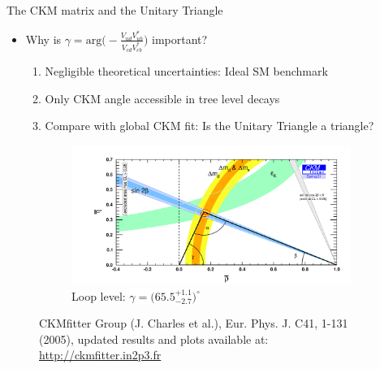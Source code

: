\documentclass[dvipsnames]{beamer}
\begin{document}
\begin{frame}{The CKM matrix and the Unitary Triangle}
  \begin{itemize}
    \setlength\itemsep{0.5em}
    \item{Why is $\gamma = \text{arg}\Big(-\frac{V^{\phantom{*}}_{ud}V^*_{ub}}{V^{\phantom{*}}_{cd}V^*_{cb}}\Big)$ important?}
    \begin{enumerate}
    \setlength\itemsep{0.5em}
      \item{Negligible theoretical uncertainties: Ideal SM benchmark}
      \item{Only CKM angle accessible in tree level decays}
      \item{Compare with global CKM fit: Is the Unitary Triangle a triangle?}
    \end{enumerate}
  \end{itemize}
  \vspace{-0.2cm}
  \begin{figure}
    \centering
    \begin{subfigure}{0.5\textwidth}
      \centering
      \includegraphics[width = 1.0\textwidth]{Plots/ckmfitter_loop.png}
      \caption*{Loop level: \colorbox{white}{$\gamma = \big(65.5^{+1.1}_{-2.7}\big)^\circ$}}
    \end{subfigure}
    \vspace{-0.3cm}
    \captionsetup{justification=centering}
    \caption*{\centering\tiny CKMfitter Group (J. Charles et al.), Eur. Phys. J. C41, 1-131 (2005), updated results and plots available at: \href{http://ckmfitter.in2p3.fr}{http://ckmfitter.in2p3.fr}}
  \end{figure}
  \vspace{-0.7cm}
  \begin{center}
    \phantom{Need to reduce uncertainties significantly in direct measurements!}
  \end{center}
\end{frame}
\end{document}
